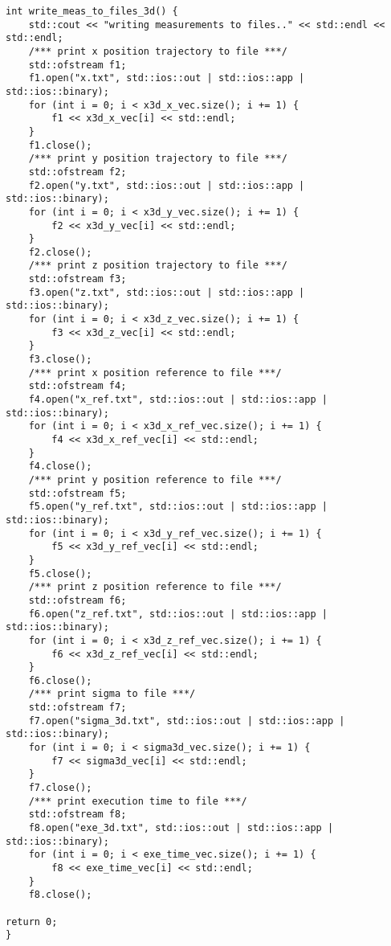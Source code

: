 \begin{lstlisting}[language=gedit]
int write_meas_to_files_3d() {
    std::cout << "writing measurements to files.." << std::endl << std::endl;
    /*** print x position trajectory to file ***/
    std::ofstream f1;
    f1.open("x.txt", std::ios::out | std::ios::app | std::ios::binary);
    for (int i = 0; i < x3d_x_vec.size(); i += 1) {
        f1 << x3d_x_vec[i] << std::endl;
    }
    f1.close();
    /*** print y position trajectory to file ***/
    std::ofstream f2;
    f2.open("y.txt", std::ios::out | std::ios::app | std::ios::binary);
    for (int i = 0; i < x3d_y_vec.size(); i += 1) {
        f2 << x3d_y_vec[i] << std::endl;
    }
    f2.close();
    /*** print z position trajectory to file ***/
    std::ofstream f3;
    f3.open("z.txt", std::ios::out | std::ios::app | std::ios::binary);
    for (int i = 0; i < x3d_z_vec.size(); i += 1) {
        f3 << x3d_z_vec[i] << std::endl;
    }
    f3.close();
    /*** print x position reference to file ***/
    std::ofstream f4;
    f4.open("x_ref.txt", std::ios::out | std::ios::app | std::ios::binary);
    for (int i = 0; i < x3d_x_ref_vec.size(); i += 1) {
        f4 << x3d_x_ref_vec[i] << std::endl;
    }
    f4.close();
    /*** print y position reference to file ***/
    std::ofstream f5;
    f5.open("y_ref.txt", std::ios::out | std::ios::app | std::ios::binary);
    for (int i = 0; i < x3d_y_ref_vec.size(); i += 1) {
        f5 << x3d_y_ref_vec[i] << std::endl;
    }
    f5.close();
    /*** print z position reference to file ***/
    std::ofstream f6;
    f6.open("z_ref.txt", std::ios::out | std::ios::app | std::ios::binary);
    for (int i = 0; i < x3d_z_ref_vec.size(); i += 1) {
        f6 << x3d_z_ref_vec[i] << std::endl;
    }
    f6.close();
    /*** print sigma to file ***/
    std::ofstream f7;
    f7.open("sigma_3d.txt", std::ios::out | std::ios::app | std::ios::binary);
    for (int i = 0; i < sigma3d_vec.size(); i += 1) {
        f7 << sigma3d_vec[i] << std::endl;
    }
    f7.close();
    /*** print execution time to file ***/
    std::ofstream f8;
    f8.open("exe_3d.txt", std::ios::out | std::ios::app | std::ios::binary);
    for (int i = 0; i < exe_time_vec.size(); i += 1) {
        f8 << exe_time_vec[i] << std::endl;
    }
    f8.close();

return 0;
}
\end{lstlisting}